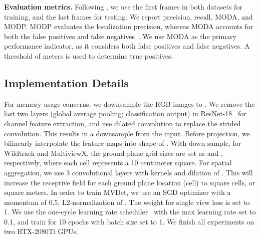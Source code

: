 \documentclass[runningheads]{llncs}
\begin{document}
\textbf{Evaluation metrics. }
Following \cite{chavdarova2018wildtrack}, we use the first  frames in both datasets for training, and the last  frames for testing. 
We report precision, recall, MODA, and MODP. MODP evaluates the localization precision, whereas MODA accounts for both the false positives and false negatives~\cite{kasturi2008framework}. We use MODA as the primary performance indicator, as it considers both false positives and false negatives. A threshold of  meters is used to determine true positives. 

\subsection{Implementation Details}
\label{sec:sec:implementation}
For memory usage concerns, we downsample the  RGB images to . We remove the last two layers (global average pooling; classification output) in ResNet-18~\cite{he2016deep} for  channel feature extraction, and use dilated convolution to replace the strided convolution. This results in a  downsample from the  input. Before projection, we bilinearly interpolate the feature maps into shape of . With  down sample, for Wildtrack and MultiviewX, the ground plane grid sizes are set as  and , respectively, where each cell represents a 10 centimeter square. For spatial aggregation, we use 3 convolutional layers with  kernels and dilation of . This will increase the receptive field for each ground plane location (cell) to  square cells, or  square meters. 
In order to train MVDet, we use an SGD optimizer with a momentum of 0.5, L2-normalization of . The weight  for single view loss is set to 1. We use the one-cycle learning rate scheduler~\cite{smith2019super} with the max learning rate set to 0.1, and train for 10 epochs with batch size set to 1. We finish all experiments on two RTX-2080Ti GPUs. 
\end{document}
